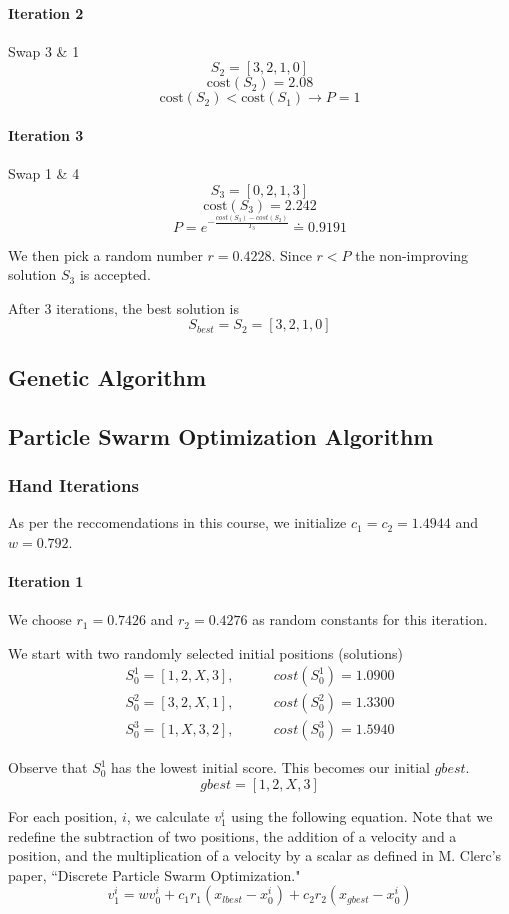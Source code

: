 \documentclass[a4paper]{article}
\newcommand{\subsubsubsection}[1]{\paragraph{#1} \mbox{}}
\begin{document}
\subsubsubsection{Iteration 2}

Swap 3 \& 1
$$S_2 = [ 3, 2, 1, 0 ]$$
$$\text{cost}(S_2) = 2.08$$
$$\text{cost}(S_2) < \text{cost}(S_1) \rightarrow P = 1$$

\subsubsubsection{Iteration 3}

Swap 1 \& 4
$$S_3 = [ 0, 2, 1, 3 ]$$
$$\text{cost}(S_3) = 2.242$$
$$P = e^{-\frac{cost(S_3) - cost(S_2)}{T_3}} \doteq 0.9191$$

We then pick a random number $r = 0.4228$. Since $r < P$ the non-improving solution $S_3$ is accepted.

After 3 iterations, the best solution is
$$S_{best} = S_2 = [ 3, 2, 1, 0 ]$$

\subsection{Genetic Algorithm} %

\subsection{Particle Swarm Optimization Algorithm} %

\subsubsection{Hand Iterations}

As per the reccomendations in this course, we initialize $c_1 = c_2 = 1.4944$ and $w = 0.792$.

\subsubsubsection{Iteration 1}

We choose $r_1 = 0.7426$ and $r_2 = 0.4276$ as random constants for this iteration.

We start with two randomly selected initial positions (solutions)
\begin{align*}
S_0^1 = [1, 2, X, 3], & \qquad cost(S_0^1) = 1.0900 \\
S_0^2 = [3, 2, X, 1], & \qquad cost(S_0^2) = 1.3300 \\
S_0^3 = [1, X, 3, 2], & \qquad cost(S_0^3) = 1.5940
\end{align*}

Observe that $S_0^1$ has the lowest initial score. This becomes our initial $\mathit{gbest}$.
$$\mathit{gbest} = [1, 2, X, 3]$$

For each position, $i$, we calculate $v_1^i$ using the following equation. Note that we redefine the subtraction of two positions, the addition of a velocity and a position, and the multiplication of a velocity by a scalar as defined in M. Clerc's paper, ``Discrete Particle Swarm Optimization."
$$v_1^i = w v_0^i + c_1 r_1 (x_\mathit{lbest} - x_0^i) + c_2 r_2 (x_\mathit{gbest} - x_0^i)$$
\end{document}
